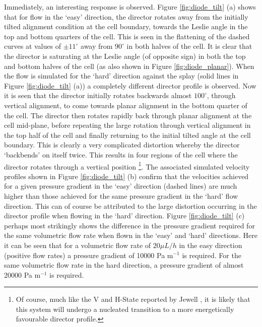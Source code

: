 Immediately, an interesting response is observed. Figure \ref{fig:diode_tilt} (a) shows that for flow in the `easy' direction, the director  rotates away from the initially tilted alignment condition at the cell boundary, towards the Leslie angle in the top and bottom quarters of the cell. This is seen in the flattening of the dashed curves at values of $\pm11^{\circ}$ away from $90^{\circ}$ in both halves of the cell. It is clear that the director is saturating at the Leslie angle (of opposite sign) in both the top and bottom halves of the cell (as also shown in Figure \ref{fig:diode_planar}). When the flow is simulated for the `hard' direction against the splay (solid lines in Figure \ref{fig:diode_tilt} (a)) a completely different director profile is observed. Now it is seen that the director initially rotates backwards almost $100^{\circ}$, through vertical alignment, to come towards planar alignment in the bottom quarter of the cell. The director then rotates rapidly back through planar alignment at the cell mid-plane, before repeating the large rotation through vertical alignment in the top half of the cell and finally returning to the initial tilted angle at the cell boundary. This is clearly a very complicated distortion whereby the director `backbends' on itself twice. This results in four regions of the cell where the director rotates through a vertical position \footnote{Of course, much like the V and H-State reported by Jewell \cite{Jewell2009}, it is likely that this system will undergo a nucleated transition to a more energetically favourable director profile.}. The associated simulated velocity profiles shown in Figure \ref{fig:diode_tilt} (b) confirm that the velocities achieved for a given pressure gradient in the `easy' direction (dashed lines) are much higher than those achieved for the same pressure gradient in the `hard' flow direction. This can of course be attributed to the large distortion occurring in the director profile when flowing in the `hard' direction.
Figure \ref{fig:diode_tilt} (c) perhaps most strikingly shows the difference in the pressure gradient required for the same volumetric flow rate when flown in the `easy' and `hard' directions. Here it can be seen that for a volumetric flow rate of $20 \mu L/h$ in the easy direction (positive flow rates) a pressure gradient of 10000 Pa m$^{-1}$ is required. For the same volumetric flow rate in the hard direction, a pressure gradient of almost 20000 Pa m$^{-1}$ is required.



